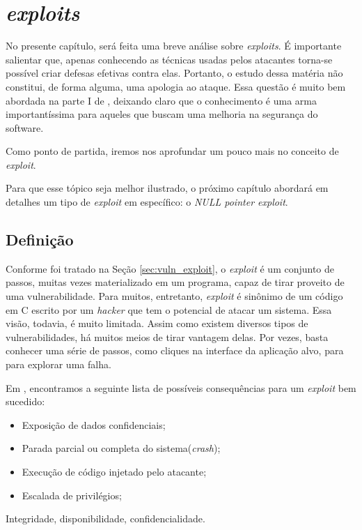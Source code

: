 
\chapter{\textsl{exploits}}
\label{chap:exploits}
	No presente capítulo, será feita uma breve análise sobre \textsl{exploits}.
	É importante salientar que, apenas conhecendo as técnicas usadas pelos atacantes
	torna-se possível criar defesas efetivas contra elas.
	Portanto, o estudo dessa matéria não constitui, de forma alguma, uma apologia
	ao ataque. Essa questão é muito bem abordada na parte I de \cite{Harris2008}, deixando
	claro que o conhecimento é uma arma importantíssima para aqueles que buscam
	uma melhoria na segurança do software.
	

	Como ponto de partida, iremos nos aprofundar um pouco mais no conceito de \textsl{exploit}.

	Para que esse tópico seja melhor ilustrado, o próximo capítulo abordará em detalhes um 
	tipo de \textsl{exploit} em específico: o \textsl{NULL pointer exploit}.

	\section{Definição}
		Conforme foi tratado na Seção \ref{sec:vuln_exploit}, o \textsl{exploit} é um conjunto de passos,
		muitas vezes materializado em um programa, capaz de tirar proveito de uma vulnerabilidade.
		Para muitos, entretanto, \textsl{exploit} é sinônimo de um código em C escrito por um \textsl{hacker}
		que tem o potencial de atacar um sistema. Essa visão, todavia, é muito limitada.
		Assim como existem diversos tipos de vulnerabilidades, há muitos meios de tirar vantagem
		delas. Por vezes, basta conhecer uma série de passos, como cliques na interface
		da aplicação alvo, para para explorar uma falha.

		
		Em \cite{Hoglund2004}, encontramos a seguinte lista de possíveis consequências
		para um \textsl{exploit} bem sucedido:
		\begin{itemize}
			\item{Exposição de dados confidenciais;}
			\item{Parada parcial ou completa do sistema(\textsl{crash});}
			\item{Execução de código injetado pelo atacante;}
			\item{Escalada de privilégios;}
		\end{itemize}
		Integridade, disponibilidade, confidencialidade.

